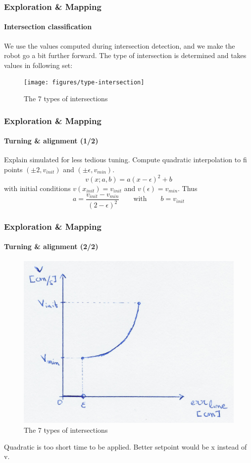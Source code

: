 \documentclass[10pt]{beamer}
\begin{document}

\begin{frame}
\frametitle{Exploration \& Mapping}
\framesubtitle{Intersection classification}
We use the values computed during intersection detection, and we make the robot go a bit further forward. The type of intersection is determined and takes values in following set:
\begin{figure}[hbtp]
\centering
\label{fig:type-intersection}
\texttt{[image: figures/type-intersection]}
\caption{The 7 types of intersections}
\end{figure}
\end{frame}


\begin{frame}[label={frame:align}]
\frametitle{Exploration \& Mapping}
\framesubtitle{Turning \& alignment (1/2)}
Explain simulated for less tedious tuning.
Compute quadratic interpolation to fi points $(\pm2,v_{init})$ and $(\pm\epsilon,v_{min})$.
$$
v(x;a,b) = a(x-\epsilon)^2+b 
$$
with initial conditions $v(x_{init}) = v_{init}$ and $v(\epsilon) = v_{min}$. Thus
$$
a = \frac{v_{init}-v_{min}}{(2-\epsilon)^2}
\qquad\text{with}\qquad
b = v_{init}
$$
\end{frame}

\begin{frame}
\frametitle{Exploration \& Mapping}
\framesubtitle{Turning \& alignment (2/2)}
\begin{figure}[hbtp]
\centering
\label{fig:type-intersection}
\includegraphics[scale=0.07]{figures/turn-align}
\caption{The 7 types of intersections}
\end{figure}
Quadratic is too short time to be applied. Better setpoint would be x instead of v.
\end{frame}
\end{document}

